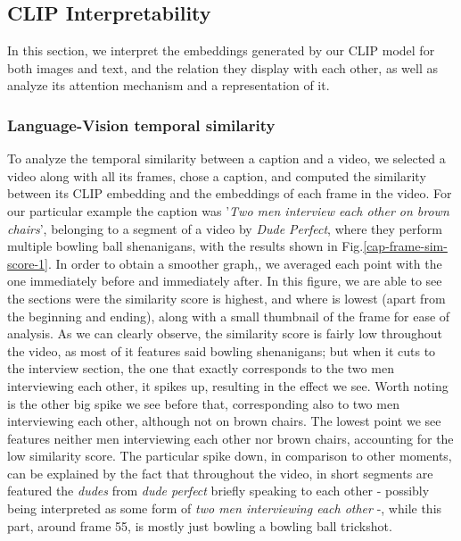 \documentclass[runningheads]{llncs}
\begin{document}
\subsection{CLIP Interpretability}

In this section, we interpret the embeddings generated by our CLIP model for both images and text, and the relation they display with each other, as well as analyze its attention mechanism and a representation of it.

\subsubsection{Language-Vision temporal similarity}
To analyze the temporal similarity between a caption and a video, we selected a video along with all its frames, chose a caption, and computed the similarity between its CLIP embedding and the embeddings of each frame in the video. For our particular example the caption was '\textit{Two men interview each other on brown chairs}', belonging to a segment of a video by \textit{Dude Perfect}, where they perform multiple bowling ball shenanigans, with the results shown in Fig.\ref{cap-frame-sim-score-1}. In order to obtain a smoother graph,, we averaged each point with the one immediately before and immediately after. In this figure, we are able to see the sections were the similarity score is highest, and where is lowest (apart from the beginning and ending), along with a small thumbnail of the frame for ease of analysis. As we can clearly observe, the similarity score is fairly low throughout the video, as most of it features said bowling shenanigans; but when it cuts to the interview section, the one that exactly corresponds to the two men interviewing each other, it spikes up, resulting in the effect we see. Worth noting is the other big spike we see before that, corresponding also to two men interviewing each other, although not on brown chairs. The lowest point we see features neither men interviewing each other nor brown chairs, accounting for the low similarity score. The particular spike down, in comparison to other moments, can be explained by the fact that throughout the video, in short segments are featured the \textit{dudes} from \textit{dude perfect} briefly speaking to each other - possibly being interpreted as some form of \textit{two men interviewing each other} -, while this part, around frame 55, is mostly just bowling a bowling ball trickshot.
\end{document}
